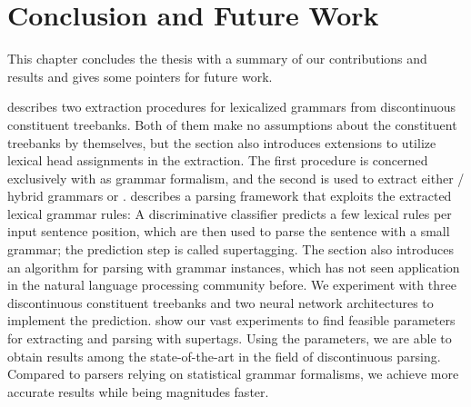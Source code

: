 \documentclass[../document.tex]{subfiles}
\begin{document}
    \chapter{Conclusion and Future Work}\label{chp:conclusion}
    This chapter concludes the thesis with a summary of our contributions and results and gives some pointers for future work.

     describes two extraction procedures for lexicalized grammars from discontinuous constituent treebanks.
    Both of them make no assumptions about the constituent treebanks by themselves, but the section also introduces extensions to utilize lexical head assignments in the extraction.
    The first procedure is concerned exclusively with  as grammar formalism, and the second is used to extract either / hybrid grammars or .
     describes a parsing framework that exploits the extracted lexical grammar rules:
        A discriminative classifier predicts a few lexical rules per input sentence position, which are then used to parse the sentence with a small grammar; the prediction step is called supertagging.
    The section also introduces an algorithm for parsing with  grammar instances, which has not seen application in the natural language processing community before.
    We experiment with three discontinuous constituent treebanks and two neural network architectures to implement the prediction.
     show our vast experiments to find feasible parameters for extracting and parsing with supertags.
    Using the parameters, we are able to obtain results among the state-of-the-art in the field of discontinuous parsing.
    Compared to parsers relying on statistical grammar formalisms, we achieve more accurate results while being magnitudes faster.
\end{document}
